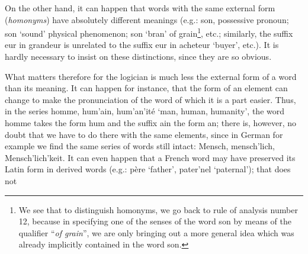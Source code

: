 {{    On the other hand, it can happen that words with the same external
    form (\emph{homonyms}) have absolutely different meanings (e.g.:
    \textup{son}, possessive pronoun; \textup{son} `sound' physical
    phenomenon; \textup{son} `bran' of grain\footnote{We see that to
      distinguish homonyms, we go back to rule of analysis number 12,
      because in specifying one of the senses of the word \textup{son}
      by means of the qualifier ``\emph{of grain}'', we are only
      bringing out a more general idea which was already implicitly
      contained in the word \textup{son}.}, etc.; similarly, the
    suffix \textup{eur} in \textup{grandeur} is unrelated to the
    suffix \textup{eur} in \textup{acheteur} `buyer', etc.).  It is
    hardly necessary to insist on these distinctions, since they are
    so obvious.

    What matters therefore for the logician is much less the external
    form of a word than its meaning.  It can happen for instance, that
    the form of an element can change to make the pronunciation of the
    word of which it is a part easier. Thus, in the series
    \textup{homme, hum'ain, hum'an'ité} `man, human, humanity', the
    word \textup{homme} takes the form \textup{hum} and the suffix
    \textup{ain} the form \textup{an}; there is, however, no doubt
    that we have to do there with the same elements, since in German
    for example we find the same series of words still intact:
    \textup{Mensch, mensch'lich, Mensch'lich'keit}. It can even happen
    that a French word may have preserved its Latin form in derived
    words (e.g.: \textup{père} `father', \textup{pater'nel}
    `paternal'); that does not


    }
  }

